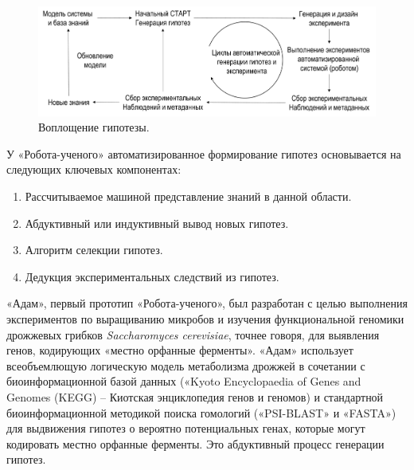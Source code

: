 \begin{figure}[ht]
    \centering
    \includegraphics[width=1.0\linewidth]{images/RobotScientistCycle.pdf}
    \caption{Воплощение гипотезы.}\label{fig:RobotScientistCycle}
\end{figure}

У «Робота-ученого» автоматизированное формирование гипотез основывается на следующих ключевых компонентах:

\begin{enumerate}
    \item Рассчитываемое машиной представление знаний в данной области.
    \item Абдуктивный или индуктивный вывод новых гипотез.
    \item Алгоритм селекции гипотез.
    \item Дедукция экспериментальных следствий из гипотез.
\end{enumerate}	

«Адам», первый прототип «Робота-ученого», был разработан с целью выполнения экспериментов по выращиванию микробов 
и изучения функциональной геномики дрожжевых грибков \textit{Saccharomyces cerevisiae}, точнее говоря, для выявления 
генов, кодирующих «местно орфанные ферменты». «Адам» использует всеобъемлющую логическую модель метаболизма дрожжей в 
сочетании с биоинформационной базой данных («Kyoto Encyclopaedia of Genes and Genomes (KEGG) – Киотская энциклопедия 
генов и геномов) и стандартной биоинформационной методикой поиска гомологий («PSI-BLAST» и «FASTA») для выдвижения 
гипотез о вероятно потенциальных генах, которые могут кодировать местно орфанные ферменты. Это абдуктивный процесс 
генерации гипотез.

